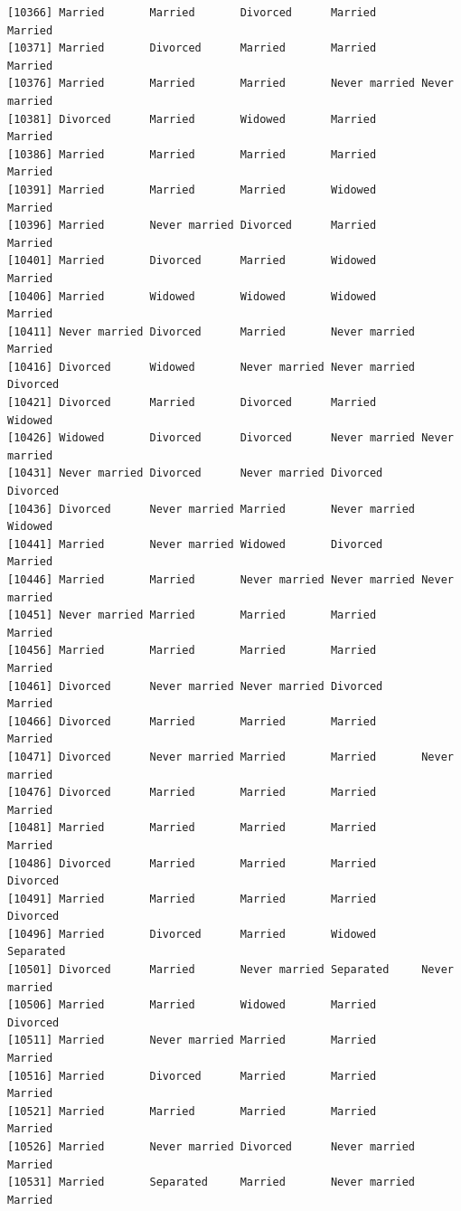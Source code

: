 \documentclass[
  letterpaper,
  DIV=11,
  numbers=noendperiod,
  oneside]{scrartcl}
\begin{document}
\begin{verbatim}
[10366] Married       Married       Divorced      Married       Married      
[10371] Married       Divorced      Married       Married       Married      
[10376] Married       Married       Married       Never married Never married
[10381] Divorced      Married       Widowed       Married       Married      
[10386] Married       Married       Married       Married       Married      
[10391] Married       Married       Married       Widowed       Married      
[10396] Married       Never married Divorced      Married       Married      
[10401] Married       Divorced      Married       Widowed       Married      
[10406] Married       Widowed       Widowed       Widowed       Married      
[10411] Never married Divorced      Married       Never married Married      
[10416] Divorced      Widowed       Never married Never married Divorced     
[10421] Divorced      Married       Divorced      Married       Widowed      
[10426] Widowed       Divorced      Divorced      Never married Never married
[10431] Never married Divorced      Never married Divorced      Divorced     
[10436] Divorced      Never married Married       Never married Widowed      
[10441] Married       Never married Widowed       Divorced      Married      
[10446] Married       Married       Never married Never married Never married
[10451] Never married Married       Married       Married       Married      
[10456] Married       Married       Married       Married       Married      
[10461] Divorced      Never married Never married Divorced      Married      
[10466] Divorced      Married       Married       Married       Married      
[10471] Divorced      Never married Married       Married       Never married
[10476] Divorced      Married       Married       Married       Married      
[10481] Married       Married       Married       Married       Married      
[10486] Divorced      Married       Married       Married       Divorced     
[10491] Married       Married       Married       Married       Divorced     
[10496] Married       Divorced      Married       Widowed       Separated    
[10501] Divorced      Married       Never married Separated     Never married
[10506] Married       Married       Widowed       Married       Divorced     
[10511] Married       Never married Married       Married       Married      
[10516] Married       Divorced      Married       Married       Married      
[10521] Married       Married       Married       Married       Married      
[10526] Married       Never married Divorced      Never married Married      
[10531] Married       Separated     Married       Never married Married      

\end{verbatim}
\end{document}
